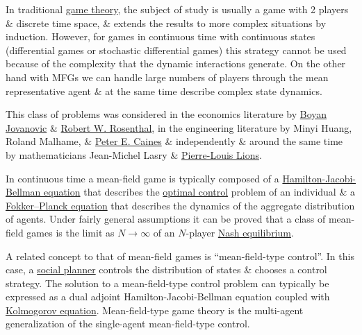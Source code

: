 \documentclass{article}
\begin{document}
In traditional \href{https://en.wikipedia.org/wiki/Game_theory}{game theory}, the subject of study is usually a game with 2 players \& discrete time space, \& extends the results to more complex situations by induction. However, for games in continuous time with continuous states (differential games or stochastic differential games) this strategy cannot be used because of the complexity that the dynamic interactions generate. On the other hand with MFGs we can handle large numbers of players through the mean representative agent \& at the same time describe complex state dynamics.

This class of problems was considered in the economics literature by \href{https://en.wikipedia.org/wiki/Boyan_Jovanovic}{Boyan Jovanovic} \& \href{https://en.wikipedia.org/wiki/Robert_W._Rosenthal}{Robert W. Rosenthal}, in the engineering literature by Minyi Huang, Roland Malhame, \& \href{https://en.wikipedia.org/wiki/Peter_E._Caines}{Peter E. Caines} \& independently \& around the same time by mathematicians Jean-Michel Lasry \& \href{https://en.wikipedia.org/wiki/Pierre-Louis_Lions}{Pierre-Louis Lions}.

In continuous time a mean-field game is typically composed of a \href{https://en.wikipedia.org/wiki/Hamilton%E2%80%93Jacobi%E2%80%93Bellman_equation}{Hamilton-Jacobi-Bellman equation} that describes the \href{https://en.wikipedia.org/wiki/Optimal_control}{optimal control} problem of an individual \& a \href{https://en.wikipedia.org/wiki/Fokker%E2%80%93Planck_equation}{Fokker--Planck equation} that describes the dynamics of the aggregate distribution of agents. Under fairly general assumptions it can be proved that a class of mean-field games is the limit as $N\to\infty$ of an $N$-player \href{https://en.wikipedia.org/wiki/Nash_equilibrium}{Nash equilibrium}.

A related concept to that of mean-field games is ``mean-field-type control''. In this case, a \href{https://en.wikipedia.org/wiki/Social_planner}{social planner} controls the distribution of states \& chooses a control strategy. The solution to a mean-field-type control problem can typically be expressed as a dual adjoint Hamilton-Jacobi-Bellman equation coupled with \href{https://en.wikipedia.org/wiki/Fokker%E2%80%93Planck_equation}{Kolmogorov equation}. Mean-field-type game theory is the multi-agent generalization of the single-agent mean-field-type control.
\end{document}
